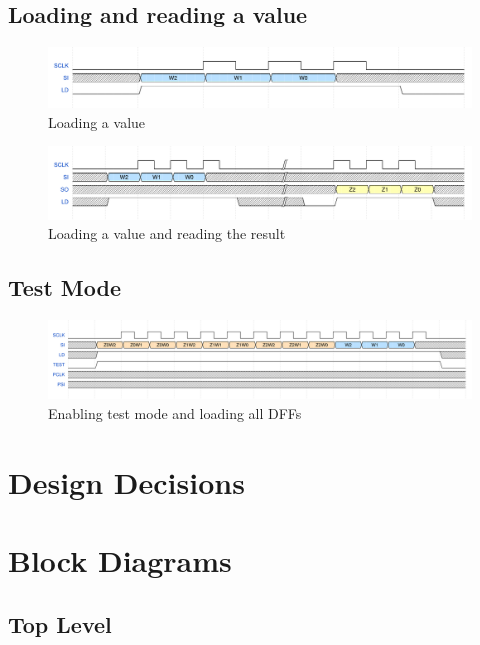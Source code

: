 \documentclass{article}
\begin{document}
\subsection{Loading and reading a value}
\begin{figure}[H]
    \centering
    \includegraphics[width=\linewidth]{../waveforms/shift_load.png}
    \caption{Loading a value}
\end{figure}

\begin{figure}[H]
    \centering
    \includegraphics[width=\linewidth]{../waveforms/shift_load_read.png}
    \caption{Loading a value and reading the result}
\end{figure}

\subsection{Test Mode}

\begin{figure}[H]
    \centering
    \includegraphics[width=\linewidth]{../waveforms/test.png}
    \caption{Enabling test mode and loading all DFFs}
\end{figure}

\section{Design Decisions}

\section{Block Diagrams}

    \subsection{Top Level}
\end{document}
